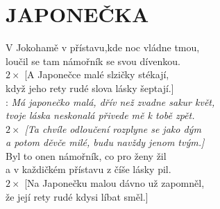 \section*{\Huge JAPONEČKA}

V Jokohamě v přístavu,kde noc vládne tmou,\\
loučil se tam námořník se svou dívenkou.\\
$2\times$ [A Japonečce malé slzičky stékají,\\
když jeho rety rudé slova lásky šeptají.]\\

\textregistered: \emph{Má japonečko malá, dřív než zvadne sakur květ,\\
tvoje láska neskonalá přivede mě k tobě zpět.\\
$2\times$ [Ta chvíle odloučení rozplyne se jako dým\\
a potom děvče milé, budu navždy jenom tvým.]}\\

Byl to onen námořník, co pro ženy žil\\
a v každičkém přístavu z číše lásky pil.\\
$2\times$ [Na Japonečku malou dávno už zapomněl,\\
že její rety rudé kdysi líbat směl.]\\

\textregistered

\newpage
